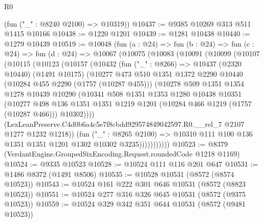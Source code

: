 \begin{lexlean}{R0}
\begin{coremodule}
      (fun ("_" : @8240 @2100) => @10319))
@10437 := @9385 @10269 @313 @511 @1415 @10166
@10438 := @1220 @1201
@10439 := @1281 @10438
@10440 := @1279 @10439
@10519 := @10048
    (fun (a : @24) =>
    fun (b : @24) =>
    fun (c : @24) =>
    fun (d : @24) =>
    @10067
      (@10075
        (@10083
          (@10091
            (@10099
              (@10107
                (@10115
                  (@10123
                    (@10157
                      (@10432
                        (fun ("_" : @8266) =>
                        @10437
                          (@2320 @10440)
                          (@1491 @10175)
                          (@10277
                            @473
                            @510
                            @1351
                            @1372
                            @2290
                            @10440
                            (@10284 @455 @2290 (@1757 (@10287 @455)))
                            (@10278
                              @509
                              @1351
                              @1354
                              @1278
                              @10439
                              @10290
                              (@10341
                                @508
                                @1351
                                @1353
                                @1280
                                @10438
                                @10351
                                (@10277
                                  @498
                                  @136
                                  @1351
                                  @1351
                                  @1219
                                  @1201
                                  (@10284 @466 @1219 (@1757 (@10287 @466)))
                                  @10302))))
                          (LexLeanPreserve.C4d0b6a4c5e7f8cbdd929574849042597.R0.__rel_7
                            @2107
                            @1277
                            @1232
                            @1218))
                        (fun ("_" : @8265 @2100) =>
                        @10310 @111 @100 @136 @1351 @1351 @1201 @1302 @10302 @3235)))))))))))
@10523 := @8379 (VerdantEngine.GroupedSixEncoding.Request.roundedCode @1218 @1169)
@10524 := @9335 @10523
@10528 := @10524 @111 @116 @201 @647
@10531 := @1486 @8372 (@1491 @8506)
@10535 := @10528 @10531 (@8572 (@8574 @10523))
@10543 := @10524 @161 @222 @301 @646 @10531 (@8572 (@8823 @10523))
@10551 := @10524 @277 @316 @326 @645 @10531 (@8572 (@9375 @10523))
@10559 := @10524 @329 @342 @351 @644 @10531 (@8572 (@9481 @10523))

\end{coremodule}
\end{lexlean}
